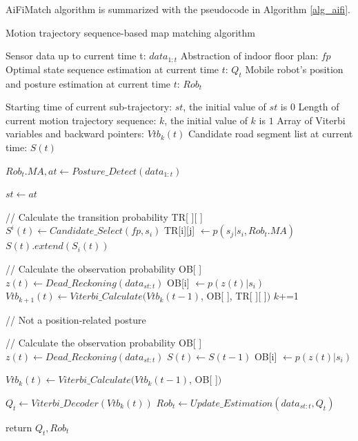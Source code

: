 \documentclass{llncs}
\begin{document}
AiFiMatch algorithm is summarized with the pseudocode in Algorithm \ref{alg_aifi}.  

\begin{algorithm}[H]
	\caption{Motion trajectory sequence-based map matching algorithm}
	\label{alg_aifi}
	\begin{algorithmic}[1]
		
		\renewcommand{\algorithmicrequire}{\textbf{Input:}}
		\renewcommand{\algorithmicensure}{\textbf{Output:}}
		\REQUIRE Sensor data up to current time t: $data_{1:t}$
		\REQUIRE Abstraction of indoor floor plan: $fp$
		\ENSURE Optimal state sequence estimation at current time $t$: $Q_t$
		\ENSURE Mobile robot's position and posture estimation at current time $t$: ${Rob}_t$
		
		\renewcommand{\algorithmicrequire}{\textbf{Define:}}
		\REQUIRE Starting time of current sub-trajectory: $st$, the initial value of $st$ is $0$
		\REQUIRE Length of current motion trajectory sequence: $k$, the initial value of $k$ is $1$
		\REQUIRE Array of Viterbi variables and backward pointers: ${Vtb}_{k}(t)$
		\REQUIRE Candidate road segment list at current time: $S(t)$
		
		
		\STATE ${{Rob}_{t}.{MA}}, at \leftarrow Posture\_Detect({data_{1:t}})$
		
		
			\STATE ${st} \leftarrow {at}$  
			
			\STATE // Calculate the transition probability TR[ ][ ]
			\STATE $S^i(t) \leftarrow Candidate\_Select(fp, s_i)$
			\STATE TR[i][j] $\leftarrow p(s_j|s_i,Rob_t.MA)$
			\ENDFOR
			\STATE $S(t).extend(S_i(t))$
			\ENDFOR
			
			\STATE // Calculate the observation probability OB[ ]
			\STATE $z(t) \leftarrow Dead\_Reckoning(data_{st:t})$
			\STATE OB[i] $\leftarrow p(z(t)|s_i)$
			\ENDFOR
			\STATE $Vtb_{k+1}(t) \leftarrow Viterbi\_Calculate(Vtb_{k}(t-1)$, OB[ ], TR[ ][ ]$)$
			\STATE $k$+=1
		
		\ELSE // Not a position-related posture
		
			\STATE // Calculate the observation probability OB[ ]
			\STATE $z(t) \leftarrow Dead\_Reckoning(data_{st:t})$
			\STATE $S(t) \leftarrow S(t-1)$
			\STATE OB[i] $\leftarrow p(z(t)|s_i)$
			\ENDFOR
			
			\STATE $Vtb_{k}(t) \leftarrow Viterbi\_Calculate(Vtb_{k}(t-1)$, OB[ ]$)$
			
		\ENDIF
		
		\STATE $Q_t \leftarrow Viterbi\_Decoder(Vtb_{k}(t))$
		\STATE $Rob_t \leftarrow Update\_Estimation(data_{st:t}, Q_t)$
		
		\State return $Q_t, Rob_t$
	\end{algorithmic}
\end{algorithm}
\end{document}
